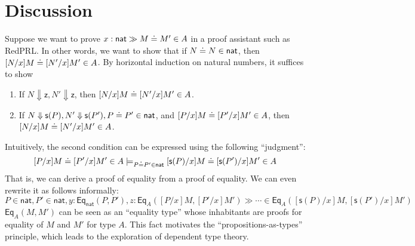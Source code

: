 \documentclass{article}
\newcommand{\tnat}{\mathsf{nat}}
\newcommand{\ez}{\mathsf{z}}
\newcommand{\es}[1]{\mathsf{s}(#1)}
\newcommand{\evalto}{\Downarrow}
\begin{document}
\section{Discussion}

Suppose we want to prove $x : \tnat \gg M \eeq M' \in A$ in a proof assistant such as RedPRL.
In other words, we want to show that if $N \eeq N \in \tnat$, then $[N/x]M \doteq [N'/x]M' \in A$.
By horizontal induction on natural numbers, it suffices to show
\begin{enumerate}
    \item If $N \evalto \ez, N' \evalto \ez$, then $[N/x]M \doteq [N'/x]M' \in A$.
    \item If $N \evalto \es{P}, N' \evalto \es{P'}, P \eeq P' \in \tnat$, and $[P/x]M \doteq [P'/x]M' \in A$, then $[N/x]M \doteq [N'/x]M' \in A$.
\end{enumerate}
Intuitively, the second condition can be expressed using the following ``judgment'':
\[
[P/x]M \eeq [P'/x]M' \in A \models_{P \eeq P' \in \tnat} [\es{P}/x]M \eeq [\es{P'}/x]M' \in A
\]
That is, we can derive a proof of equality from a proof of equality.
We can even rewrite it as follows informally:
\[
P \in \tnat, P' \in \tnat, y : \mathsf{Eq}_{\tnat}(P,P'), z : \mathsf{Eq}_{A}([P/x]M,[P'/x]M') \gg \cdots \in \mathsf{Eq}_A([\es{P}/x]M,[\es{P'}/x]M')
\]
$\mathsf{Eq}_A(M,M')$ can be seen as an ``equality type'' whose inhabitants are proofs for equality of $M$ and $M'$ for type $A$.
This fact motivates the ``propositions-as-types'' principle, which leads to the exploration of dependent type theory.

% 
% 
\end{document}
